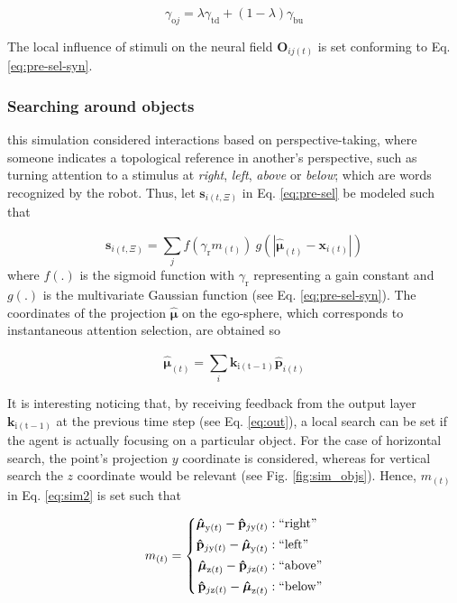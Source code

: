 \documentclass[letterpaper, 10 pt, conference]{ieeeconf}  %
\begin{document}
	 \begin{equation}
	 \gamma_{\mathrm{o}j} = \lambda\gamma_\mathrm{td}+ (1-\lambda)\gamma_\mathrm{bu}
	 \label{eq:sim1-step}
	 \end{equation}
	
	\noindent The local influence of stimuli on the neural field $\mathbf{O}_{ij(t)}$ is set conforming to Eq. \eqref{eq:pre-sel-syn}.
	
	\subsubsection{Searching around objects} this simulation considered interactions based on perspective-taking, where someone indicates a topological reference in another's perspective, such as turning attention to a stimulus at \textit{right}, \textit{left}, \textit{above} or \textit{below}; which are words recognized by the robot. Thus, let $\mathbf{s}_{i(t,\Xi)}$ in Eq. \eqref{eq:pre-sel} be modeled such that
	
	\begin{equation}
	\mathbf{s}_{i(t,\Xi)} = \sum_{j}^{} f\left(\gamma_\mathrm{r}m_{(t)}\right)\ g\left(\left|\boldsymbol{\hat{\mu}}_{(t)} - \mathbf{x}_{i(t)}\right|\right)
	\label{eq:sim2}
	\end{equation}
	\noindent where $f(.)$ is the sigmoid function with $\gamma_\mathrm{r}$ representing a gain constant and $g(.)$ is the multivariate Gaussian function (see Eq. \eqref{eq:pre-sel-syn}). The coordinates of the projection $\boldsymbol{\hat{\mu}}$ on the ego-sphere, which corresponds to instantaneous attention selection, are obtained so 
	
	\begin{equation}
	\boldsymbol{\hat{\mu}}_{(t)} = \sum_{i}^{}\mathbf{k}_\mathrm{i(t-1)}\mathbf{\hat{p}}_{i(t)}
	\label{eq:sim2-mu}
	\end{equation}
	
	It is interesting noticing that, by receiving feedback from the output layer $\mathbf{k}_\mathrm{i(t-1)}$ at the previous time step (see Eq. \eqref{eq:out}), a local search can be set if the agent is actually focusing on a particular object. For the case of horizontal search, the point's  projection $y$ coordinate is considered, whereas for vertical search the $z$ coordinate would be relevant (see Fig. \ref{fig:sim_objs}). Hence, $m_{(t)}$ in Eq. \eqref{eq:sim2} is set such that
	
	\begin{equation}
	m_{(t)} = 
	\left\{
	\begin{split}
	\boldsymbol{\hat{\mu}}_{\mathrm{y}(t)}- \mathbf{\hat{p}}_{j\mathrm{y}(t)} & : \mathrm{``right"}\\
	\mathbf{\hat{p}}_{j\mathrm{y}(t)} - \boldsymbol{\hat{\mu}}_{\mathrm{y}(t)}& : \mathrm{``left"}\\
	\boldsymbol{\hat{\mu}}_{\mathrm{z}(t)}- \mathbf{\hat{p}}_{j\mathrm{z}(t)} & : \mathrm{``above"}\\
	\mathbf{\hat{p}}_{j\mathrm{z}(t)} - \boldsymbol{\hat{\mu}}_{\mathrm{z}(t)} & : \mathrm{``below"}\\
	\end{split}\right.
	\label{eq:sim2-m}
	\end{equation}
	
\end{document}
